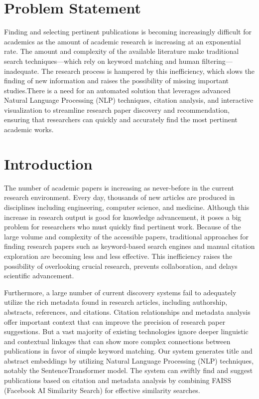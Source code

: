 \documentclass[runningheads]{llncs}
\begin{document}
\section{\textbf{Problem Statement}}
Finding and selecting pertinent publications is becoming increasingly difficult for academics as the amount of academic research is increasing at an exponential rate. The amount and complexity of the available literature make traditional search techniques—which rely on keyword matching and human filtering—inadequate. The research process is hampered by this inefficiency, which slows the finding of new information and raises the possibility of missing important studies.There is a need for an automated solution that leverages advanced Natural Language Processing (NLP) techniques, citation analysis, and interactive visualization to streamline research paper discovery and recommendation, ensuring that researchers can quickly and accurately find the most pertinent academic works.
\section{\textbf{Introduction}}
The number of academic papers is increasing as never-before in the current research environment. Every day, thousands of new articles are produced in disciplines including engineering, computer science, and medicine. Although this increase in research output is good for knowledge advancement, it poses a big problem for researchers who must quickly find pertinent work. Because of the large volume and complexity of the accessible papers, traditional approaches for finding research papers such as keyword-based search engines and manual citation exploration are becoming less and less effective. This inefficiency raises the possibility of overlooking crucial research, prevents  collaboration, and delays scientific advancement.

Furthermore, a large number of current discovery systems fail to adequately utilize the rich metadata found in research articles, including authorship, abstracts, references, and citations. Citation relationships and metadata analysis offer important  context that can improve the precision of research paper suggestions.  But a vast majority of existing technologies ignore deeper linguistic and contextual linkages that can show more complex connections between publications in favor of simple keyword matching. Our system generates title and abstract embeddings by utilizing Natural Language Processing (NLP) techniques, notably the SentenceTransformer model. The system can swiftly find and suggest publications based on citation and metadata analysis by combining FAISS (Facebook AI Similarity Search) for effective similarity searches.
\end{document}
